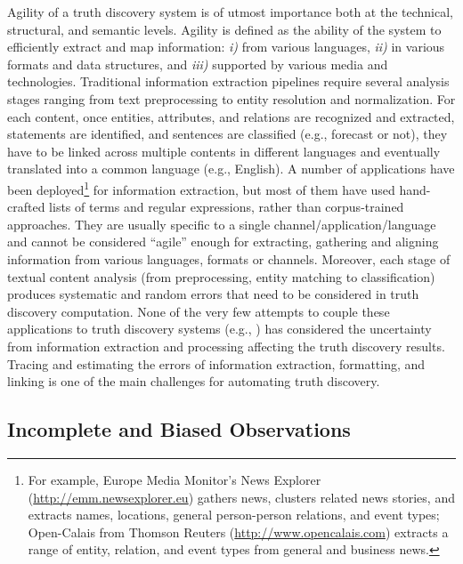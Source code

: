 \documentclass[prodmode,acmtecs]{acmsmall} %
\begin{document}
Agility of a truth discovery system is of utmost importance both at the technical, structural, and semantic levels. Agility is defined as the ability of the system to efficiently extract and map information: {\it i)} from various languages, {\it ii)} in various formats and data structures, and {\it iii)} supported by various media and technologies. Traditional information extraction pipelines  require several analysis stages ranging from text preprocessing %
 to entity resolution and normalization.  
For each content, once entities, attributes, and relations are recognized and extracted, statements are identified, and sentences are classified (e.g., forecast or not), they have to be linked across multiple contents in different languages and eventually translated into a common language (e.g., English). A number of applications have been deployed\footnote{\scriptsize{For example, Europe Media Monitor's News Explorer (\url{http://emm.newsexplorer.eu}) gathers news, clusters related news stories, and extracts names, locations, general person-person relations, and event types; Open-Calais from Thomson Reuters (\url{http://www.opencalais.com}) extracts a range of entity, relation, and event types from general and business news.}} for information extraction, but most of them have used hand-crafted lists of terms and regular expressions, rather than corpus-trained approaches. They are usually specific to a single channel/application/language and cannot be considered ``agile'' enough for extracting, gathering and 
aligning information from various languages, formats or channels.  Moreover, each stage of textual content analysis (from preprocessing, entity matching to classification) produces systematic and random errors that need to be considered in truth discovery computation. None of the very few attempts  to couple these applications to truth discovery systems (e.g., \cite{GoasdoueKKLMZ13}) has considered the uncertainty from information extraction and processing affecting the truth discovery results. Tracing and estimating the errors of information extraction, formatting, and linking  is one of the main challenges for automating truth discovery. 


\subsection{Incomplete and Biased Observations}  
\end{document}
